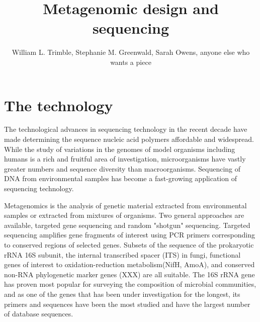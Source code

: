 \documentclass[graybox]{svmult}
\begin{document}
\title*{Metagenomic design and sequencing}
\author{William L. Trimble, Stephanie M. Greenwald, Sarah Owens, anyone else who wants a piece }
%
%
\maketitle



\section{The technology}
\label{sec:1}

The technological advances in sequencing technology in the recent decade have made determining the sequence nucleic acid polymers affordable and widespread.  While the study of variations in the genomes of model organisms including humans is a rich and fruitful area of investigation, microorganisms have vastly greater numbers and sequence diversity than macroorganisms.  Sequencing of DNA from environmental samples has become a fast-growing application of sequencing technology.

Metagenomics is the analysis of genetic material extracted from environmental samples or extracted from mixtures of organisms.  Two general approaches are available, targeted gene sequencing and random "shotgun" sequencing.    Targeted sequencing amplifies gene fragments of interest using PCR primers corresponding to conserved regions of selected genes.   Subsets of the sequence of the prokaryotic  rRNA 16S subunit, the internal transcribed spacer (ITS) in fungi, functional genes of interest to oxidation-reduction metabolism(NifH, AmoA), and conserved non-RNA phylogenetic marker genes (XXX) are all suitable.  The 16S rRNA gene has proven most popular for surveying the composition of microbial communities, and as one of the genes that has been under investigation for the longest, its primers and sequences have been the most studied and have the largest number of database sequences.
\end{document}
